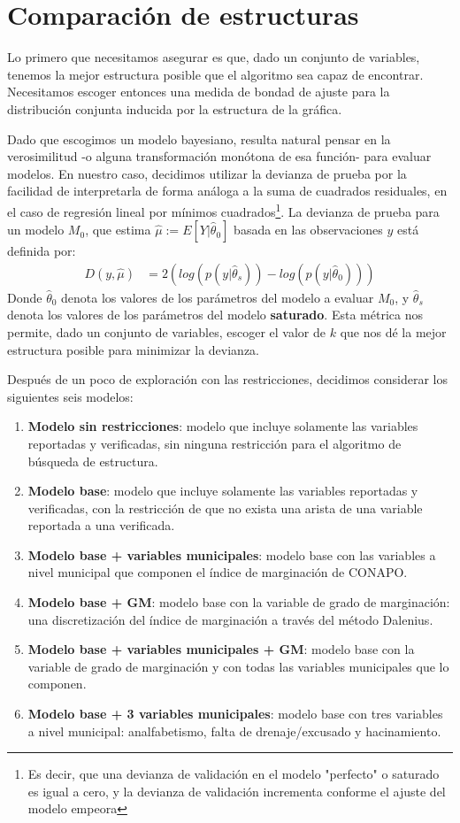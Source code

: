 \section*{Comparación de estructuras}
Lo primero que necesitamos asegurar es que, dado un conjunto de variables, tenemos la mejor estructura posible que el algoritmo sea capaz de encontrar. Necesitamos escoger entonces una medida de bondad de ajuste para la distribución conjunta inducida por la estructura de la gráfica.
\par
\noindent
Dado que escogimos un modelo bayesiano, resulta natural pensar en la verosimilitud -o alguna transformación monótona de esa función- para evaluar modelos. En nuestro caso, decidimos utilizar la devianza de prueba por la facilidad de interpretarla de forma análoga a la suma de cuadrados residuales, en el caso de regresión lineal por mínimos cuadrados\footnote{Es decir, que una devianza de validación en el modelo "perfecto" o saturado es igual a cero, y la devianza de validación incrementa conforme el ajuste del modelo empeora}. La devianza de prueba para un modelo $M_0$, que estima $\hat{\mu} := E[Y|\hat{\theta}_0]$ basada en las observaciones $y$ está definida por:
\begin{align*}
D(y, \hat{\mu}) &= 2(log(p(y|\hat{\theta}_s)) - log(p(y|\hat{\theta}_0)))
\end{align*}
Donde $\hat{\theta}_0$ denota los valores de los parámetros del modelo a evaluar $M_0$, y $\hat{\theta}_s$ denota los valores de los parámetros del modelo \textbf{saturado}. Esta métrica nos permite, dado un conjunto de variables, escoger el valor de $k$ que nos dé la mejor estructura posible para minimizar la devianza.
\par
\noindent
Después de un poco de exploración con las restricciones, decidimos considerar los siguientes seis modelos:
\begin{enumerate}
\item \textbf{Modelo sin restricciones}: modelo que incluye solamente las variables reportadas y verificadas, sin ninguna restricción para el algoritmo de búsqueda de estructura.
\item \textbf{Modelo base}: modelo que incluye solamente las variables reportadas y verificadas, con la restricción de que no exista una arista de una variable reportada a una verificada.
\item \textbf{Modelo base + variables municipales}: modelo base con las variables a nivel municipal que componen el índice de marginación de CONAPO.
\item \textbf{Modelo base + GM}: modelo base con la variable de grado de marginación: una discretización del índice de marginación a través del método Dalenius.
\item \textbf{Modelo base + variables municipales + GM}: modelo base con la variable de grado de marginación y con todas las variables municipales que lo componen.
\item \textbf{Modelo base + 3 variables municipales}: modelo base con tres variables a nivel municipal: analfabetismo, falta de drenaje/excusado y hacinamiento.
\end{enumerate}
